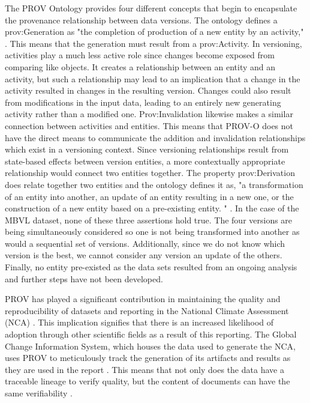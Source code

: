 The PROV Ontology provides four different concepts that begin to encapsulate the provenance relationship between data versions.  The ontology defines a prov:Generation as "the completion of production of a new entity by an activity," \cite{Lebo2013}.  This means that the generation must result from a prov:Activity.  In versioning, activities play a much less active role since changes become exposed from comparing like objects.  It creates a relationship between an entity and an activity, but such a relationship may lead to an implication that a change in the activity resulted in changes in the resulting version.  Changes could also result from modifications in the input data, leading to an entirely new generating activity rather than a modified one.  Prov:Invalidation likewise makes a similar connection between activities and entities.  This means that PROV-O does not have the direct means to communicate the addition and invalidation relationships which exist in a versioning context.  Since versioning relationships result from state-based effects between version entities, a more contextually appropriate relationship would connect two entities together.  The property prov:Derivation does relate together two entities and the ontology defines it as, "a transformation of an entity into another, an update of an entity resulting in a new one, or the construction of a new entity based on a pre-existing entity. " \cite{Lebo2013}.  In the case of the MBVL dataset, none of these three assertions hold true.  The four versions are being simultaneously considered so one is not being transformed into another as would a sequential set of versions.  Additionally, since we do not know which version is the best, we cannot consider any version an update of the others.  Finally, no entity pre-existed as the data sets resulted from an ongoing analysis and further steps have not been developed.

PROV has played a significant contribution in maintaining the quality and reproducibility of datasets and reporting in the National Climate Assessment (NCA) \cite{Ma2014191}.
This implication signifies that there is an increased likelihood of adoption through other scientific fields as a result of this reporting.
The Global Change Information System, which houses the data used to generate the NCA, uses PROV to meticulously track the generation of its artifacts and results as they are used in the report \cite{Tilmes2012}.
This means that not only does the data have a traceable lineage to verify quality, but the content of documents can have the same verifiability \cite{Ma2014}.

